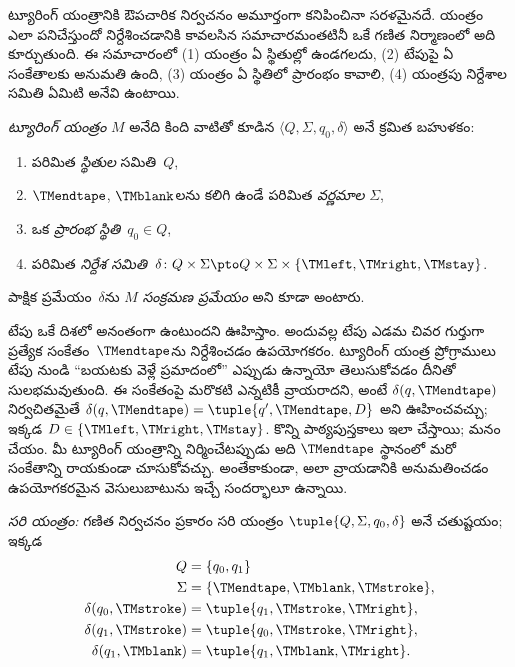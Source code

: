 \documentclass[../../../include/open-logic-section]{subfiles}
\begin{document}

\begin{explain}
ట్యూరింగ్ యంత్రానికి ఔపచారిక నిర్వచనం అమూర్తంగా కనిపించినా సరళమైనదే.
యంత్రం ఎలా పనిచేస్తుందో నిర్దేశించడానికి కావలసిన సమాచారమంతటినీ ఒకే
గణిత నిర్మాణంలో అది కూర్చుతుంది.
ఈ సమాచారంలో (1) యంత్రం ఏ స్థితుల్లో ఉండగలదు, (2) టేపుపై ఏ సంకేతాలకు అనుమతి
ఉంది, (3) యంత్రం ఏ స్థితిలో ప్రారంభం కావాలి, (4) యంత్రపు నిర్దేశాల సమితి ఏమిటి
అనేవి ఉంటాయి.
\end{explain}

\begin{defn}[ట్యూరింగ్ యంత్రం]
\emph{ట్యూరింగ్ యంత్రం} $M$ అనేది కింది వాటితో కూడిన
$\langle Q, \Sigma, q_0, \delta\rangle$ అనే క్రమిత బహుళకం:
\begin{enumerate}
\item పరిమిత \emph{స్థితుల} సమితి~$Q$,
\item $\TMendtape$, $\TMblank$లను కలిగి ఉండే పరిమిత \emph{వర్ణమాల} $\Sigma$,
\item ఒక \emph{ప్రారంభ స్థితి}~$q_0 \in Q$,
\item పరిమిత \emph{నిర్దేశ సమితి}~$\delta\colon Q \times \Sigma
  \pto Q \times \Sigma \times \{\TMleft, \TMright, \TMstay\}$.
\end{enumerate}
పాక్షిక ప్రమేయం~$\delta$ను $M$ \emph{సంక్రమణ ప్రమేయం} అని కూడా అంటారు.
\end{defn}

\begin{explain}
టేపు ఒకే దిశలో అనంతంగా ఉంటుందని ఊహిస్తాం. అందువల్ల టేపు ఎడమ చివర
గుర్తుగా ప్రత్యేక సంకేతం~$\TMendtape$ను నిర్దేశించడం ఉపయోగకరం. ట్యూరింగ్ యంత్ర
ప్రోగ్రాములు టేపు నుండి ``బయటకు వెళ్లే ప్రమాదంలో'' ఎప్పుడు ఉన్నాయో తెలుసుకోవడం
దీనితో సులభమవుతుంది. ఈ సంకేతంపై మరొకటి ఎన్నటికీ వ్రాయరాదని, అంటే
$\delta(q,\TMendtape)$ నిర్వచితమైతే
$\delta(q,\TMendtape) = \tuple{q', \TMendtape, D}$ అని ఊహించవచ్చు; ఇక్కడ
$D \in \{\TMleft,\TMright,\TMstay\}$. కొన్ని
పాఠ్యపుస్తకాలు ఇలా చేస్తాయి; మనం చేయం. మీ ట్యూరింగ్ యంత్రాన్ని నిర్మించేటప్పుడు
అది $\TMendtape$ స్థానంలో మరో సంకేతాన్ని రాయకుండా చూసుకోవచ్చు. అంతేకాకుండా,
అలా వ్రాయడానికి అనుమతించడం ఉపయోగకరమైన వెసులుబాటును ఇచ్చే సందర్భాలూ ఉన్నాయి.
\end{explain}

\begin{ex}
\emph{సరి యంత్రం:} గణిత నిర్వచనం ప్రకారం సరి యంత్రం
$\tuple{Q, \Sigma, q_0, \delta}$ అనే చతుష్టయం; ఇక్కడ
\begin{align*}
Q & = \{ q_0, q_1 \} \\
\Sigma & = \{ \TMendtape, \TMblank, \TMstroke \}, \\
\delta(q_0, \TMstroke) & = \tuple{q_1, \TMstroke, \TMright},\\
\delta(q_1, \TMstroke) & = \tuple{q_0, \TMstroke, \TMright},\\
\delta(q_1, \TMblank)  & = \tuple{q_1, \TMblank, \TMright}.
\end{align*}
\end{ex}
\end{document}
